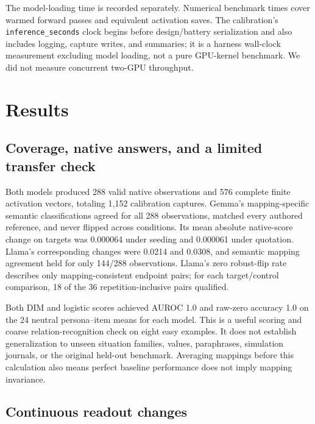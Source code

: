 The model-loading time is recorded separately. Numerical benchmark times cover warmed forward passes and equivalent activation saves. The calibration's \nolinkurl{inference_seconds} clock begins before design/battery serialization and also includes logging, capture writes, and summaries; it is a harness wall-clock measurement excluding model loading, not a pure GPU-kernel benchmark. We did not measure concurrent two-GPU throughput.

\section{Results}\label{results}

\subsection{Coverage, native answers, and a limited transfer check}\label{coverage-native-answers-and-a-limited-transfer-check}

Both models produced 288 valid native observations and 576 complete finite activation vectors, totaling 1,152 calibration captures. Gemma's mapping-specific semantic classifications agreed for all 288 observations, matched every authored reference, and never flipped across conditions. Its mean absolute native-score change on targets was 0.000064 under seeding and 0.000061 under quotation. Llama's corresponding changes were 0.0214 and 0.0308, and semantic mapping agreement held for only 144/288 observations. Llama's zero robust-flip rate describes only mapping-consistent endpoint pairs; for each target/control comparison, 18 of the 36 repetition-inclusive pairs qualified.

Both DIM and logistic scores achieved AUROC 1.0 and raw-zero accuracy 1.0 on the 24 neutral persona--item means for each model. This is a useful scoring and coarse relation-recognition check on eight easy examples. It does not establish generalization to unseen situation families, values, paraphrases, simulation journals, or the original held-out benchmark. Averaging mappings before this calculation also means perfect baseline performance does not imply mapping invariance.

\subsection{Continuous readout changes}\label{continuous-readout-changes}

